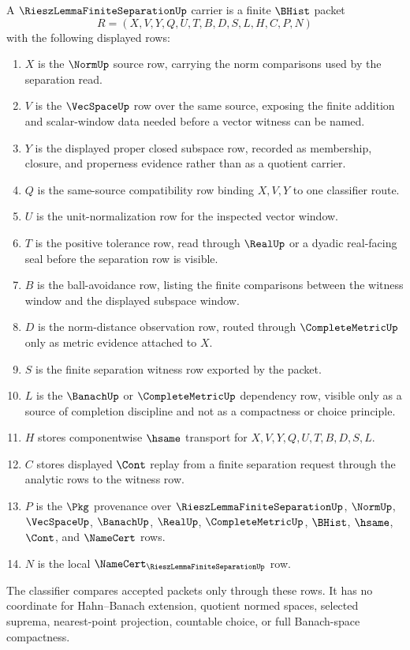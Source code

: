 \begin{definition}
\label{def:riesz-lemma-finite-separation-carrier}
A $\RieszLemmaFiniteSeparationUp$ carrier is a finite $\BHist$ packet
$$
R=(X,V,Y,Q,U,T,B,D,S,L,H,C,P,N)
$$
with the following displayed rows:
\begin{enumerate}
\item $X$ is the $\NormUp$ source row, carrying the norm comparisons used by the separation read.
\item $V$ is the $\VecSpaceUp$ row over the same source, exposing the finite addition and scalar-window data needed before a vector witness can be named.
\item $Y$ is the displayed proper closed subspace row, recorded as membership, closure, and properness evidence rather than as a quotient carrier.
\item $Q$ is the same-source compatibility row binding $X,V,Y$ to one classifier route.
\item $U$ is the unit-normalization row for the inspected vector window.
\item $T$ is the positive tolerance row, read through $\RealUp$ or a dyadic real-facing seal before the separation row is visible.
\item $B$ is the ball-avoidance row, listing the finite comparisons between the witness window and the displayed subspace window.
\item $D$ is the norm-distance observation row, routed through $\CompleteMetricUp$ only as metric evidence attached to $X$.
\item $S$ is the finite separation witness row exported by the packet.
\item $L$ is the $\BanachUp$ or $\CompleteMetricUp$ dependency row, visible only as a source of completion discipline and not as a compactness or choice principle.
\item $H$ stores componentwise $\hsame$ transport for $X,V,Y,Q,U,T,B,D,S,L$.
\item $C$ stores displayed $\Cont$ replay from a finite separation request through the analytic rows to the witness row.
\item $P$ is the $\Pkg$ provenance over $\RieszLemmaFiniteSeparationUp$, $\NormUp$, $\VecSpaceUp$, $\BanachUp$, $\RealUp$, $\CompleteMetricUp$, $\BHist$, $\hsame$, $\Cont$, and $\NameCert$ rows.
\item $N$ is the local $\NameCert_{\RieszLemmaFiniteSeparationUp}$ row.
\end{enumerate}
The classifier compares accepted packets only through these rows. It has no coordinate for Hahn--Banach extension, quotient normed spaces, selected suprema, nearest-point projection, countable choice, or full Banach-space compactness.
\end{definition}


